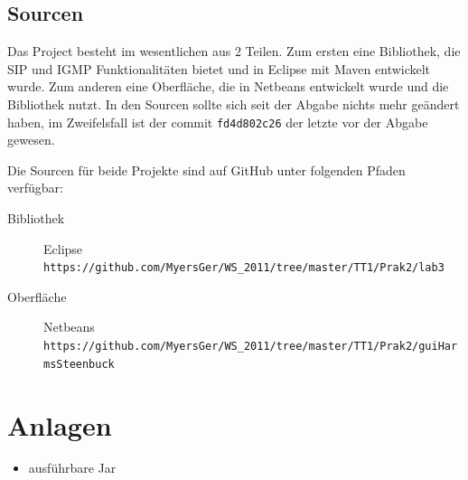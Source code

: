 \documentclass[10pt]{scrartcl}
\begin{document}
\subsection{Sourcen}
Das Project besteht im wesentlichen aus 2 Teilen. Zum ersten eine Bibliothek, die SIP und IGMP Funktionalitäten bietet und in Eclipse mit Maven entwickelt wurde. Zum anderen eine Oberfläche, die in Netbeans entwickelt wurde und die Bibliothek nutzt. In den Sourcen sollte sich seit der Abgabe nichts mehr geändert haben, im Zweifelsfall ist der commit \verb!fd4d802c26! der letzte vor der Abgabe gewesen.

Die Sourcen für beide Projekte sind auf GitHub unter folgenden Pfaden verfügbar:
\begin{description}
	\item[Bibliothek] Eclipse \\ \verb!https://github.com/MyersGer/WS_2011/tree/master/TT1/Prak2/lab3!
	\item[Oberfläche] Netbeans \\ \verb!https://github.com/MyersGer/WS_2011/tree/master/TT1/Prak2/guiHarmsSteenbuck!
\end{description}

\section{Anlagen}
\begin{itemize}
	\item ausführbare Jar
\end{itemize}
\end{document}
